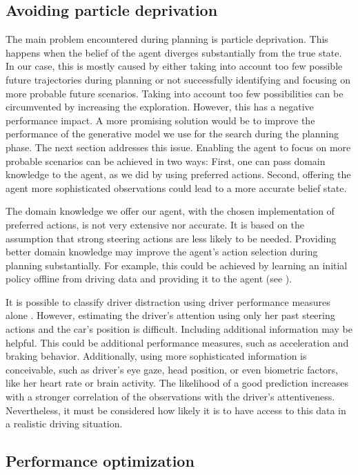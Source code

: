 \subsection{Avoiding particle deprivation}

The main problem encountered during planning is particle deprivation. This happens when the belief of the agent diverges substantially from the true state. In our case, this is mostly caused by either taking into account too few possible future trajectories during planning or not successfully identifying and focusing on more probable future scenarios. Taking into account too few possibilities can be circumvented by increasing the exploration. However, this has a negative performance impact. A more promising solution would be to improve the performance of the generative model we use for the search during the planning phase. The next section addresses this issue. Enabling the agent to focus on more probable scenarios can be achieved in two ways: First, one can pass domain knowledge to the agent, as we did by using preferred actions. Second, offering the agent more sophisticated observations could lead to a more accurate belief state.

The domain knowledge we offer our agent, with the chosen implementation of preferred actions, is not very extensive nor accurate. It is based on the assumption that strong steering actions are less likely to be needed. Providing better domain knowledge may improve the agent's action selection during planning substantially. For example, this could be achieved by learning an initial policy offline from driving data and providing it to the agent (see \cite{combining_on_offline}).  

It is possible to classify driver distraction using driver performance measures alone \parencite{dist-det-perf}. However, estimating the driver's attention using only her past steering actions and the car's position is difficult. Including additional information may be helpful. This could be additional performance measures, such as acceleration and braking behavior. Additionally, using more sophisticated information is conceivable, such as driver's eye gaze, head position, or even biometric factors, like her heart rate or brain activity. The likelihood of a good prediction increases with a stronger correlation of the observations with the driver's attentiveness. Nevertheless, it must be considered how likely it is to have access to this data in a realistic driving situation.

\subsection{Performance optimization}
\label{sec:perf_opt}

